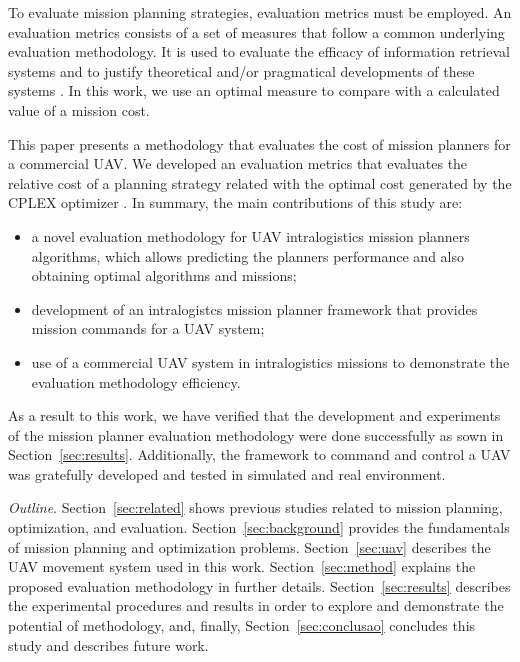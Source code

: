 \documentclass[conference]{IEEEtran}
\begin{document}

To evaluate 	mission planning strategies, evaluation metrics must be employed. An evaluation metrics consists of a set of measures that follow a common underlying evaluation methodology. It is used to evaluate the efficacy of information retrieval systems and to justify theoretical and/or pragmatical developments of these systems \cite{pehcevski2009evaluation}. In this work, we use an optimal measure to compare with a calculated value of a mission cost.

This paper presents a methodology that evaluates the cost of mission planners for a commercial UAV. We developed an evaluation metrics that evaluates the relative cost of a planning strategy related with the optimal cost generated by the CPLEX optimizer \cite{cplex2003ilog}. %
In summary, the main contributions of this study are:
\begin{itemize}
\item a novel evaluation methodology for UAV intralogistics mission planners algorithms, which allows predicting the planners performance and also obtaining optimal algorithms and missions;
\item development of an intralogistcs mission planner framework that provides mission commands for a UAV system; 
\item use of a commercial UAV system in intralogistics missions to demonstrate the evaluation methodology efficiency.
\end{itemize}

As a result to this work, we have verified that the development and experiments of the mission planner evaluation methodology were done successfully as sown in Section~\ref{sec:results}. Additionally, the framework to command and control a UAV was gratefully developed and tested in simulated and real environment.
	
\textit{Outline}. Section~\ref{sec:related} shows previous studies related to mission planning, optimization, and evaluation. Section~\ref{sec:background} provides the fundamentals of mission planning and optimization problems. Section~\ref{sec:uav} describes the UAV movement system used in this work. Section~\ref{sec:method} explains the proposed evaluation methodology in further details. Section~\ref{sec:results} describes the experimental procedures and results in order to explore and demonstrate the potential of methodology, and, finally, Section~\ref{sec:conclusao} concludes this study and describes future work.
\end{document}
